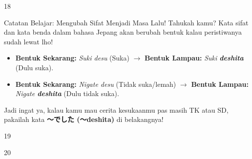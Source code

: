 \begin{convobox}{18}
    \noindent
      

    \vspace{1.5em}
\end{convobox}

\begin{lessonbox}{Catatan Belajar: Mengubah Sifat Menjadi Masa Lalu!}
    Tahukah kamu? Kata sifat dan kata benda dalam bahasa Jepang akan berubah bentuk kalau peristiwanya sudah lewat lho!
    \begin{itemize}
        \item \textbf{Bentuk Sekarang:} \textit{Suki desu} (Suka) $\rightarrow$ \textbf{Bentuk Lampau:} \textit{Suki \textbf{deshita}} (Dulu suka).
        \item \textbf{Bentuk Sekarang:} \textit{Nigate desu} (Tidak suka/lemah) $\rightarrow$ \textbf{Bentuk Lampau:} \textit{Nigate \textbf{deshita}} (Dulu tidak suka).
    \end{itemize}
    Jadi ingat ya, kalau kamu mau cerita kesukaanmu pas masih TK atau SD, pakailah kata \textbf{〜でした (〜deshita)} di belakangnya!
\end{lessonbox}

\begin{convobox}{19}
    \noindent
      

    \vspace{1.5em}
\end{convobox}

\begin{convobox}{20}
    \noindent
      
      

    \vspace{1.5em}
\end{convobox}

